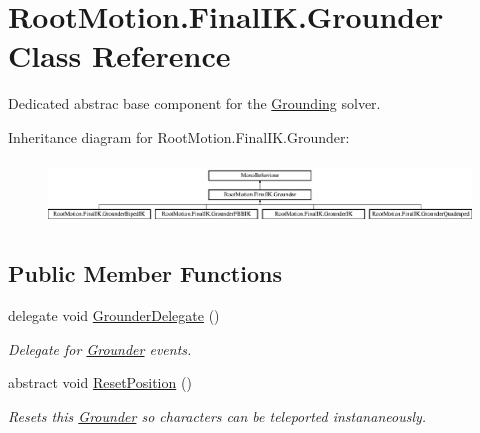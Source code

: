 \hypertarget{class_root_motion_1_1_final_i_k_1_1_grounder}{}\section{Root\+Motion.\+Final\+I\+K.\+Grounder Class Reference}
\label{class_root_motion_1_1_final_i_k_1_1_grounder}


Dedicated abstrac base component for the \mbox{\hyperlink{class_root_motion_1_1_final_i_k_1_1_grounding}{Grounding}} solver.  


Inheritance diagram for Root\+Motion.\+Final\+I\+K.\+Grounder\+:\begin{figure}[H]
\begin{center}
\leavevmode
\includegraphics[height=1.693548cm]{class_root_motion_1_1_final_i_k_1_1_grounder}
\end{center}
\end{figure}
\subsection*{Public Member Functions}
\begin{DoxyCompactItemize}
\item 
delegate void \mbox{\hyperlink{class_root_motion_1_1_final_i_k_1_1_grounder_a1278cd21a3c872dbda95d63ac710cc26}{Grounder\+Delegate}} ()
\begin{DoxyCompactList}\small\item\em Delegate for \mbox{\hyperlink{class_root_motion_1_1_final_i_k_1_1_grounder}{Grounder}} events. \end{DoxyCompactList}\item 
abstract void \mbox{\hyperlink{class_root_motion_1_1_final_i_k_1_1_grounder_aecbd8b5addf2948f4d5fcd00a1b03314}{Reset\+Position}} ()
\begin{DoxyCompactList}\small\item\em Resets this \mbox{\hyperlink{class_root_motion_1_1_final_i_k_1_1_grounder}{Grounder}} so characters can be teleported instananeously. \end{DoxyCompactList}\end{DoxyCompactItemize}
